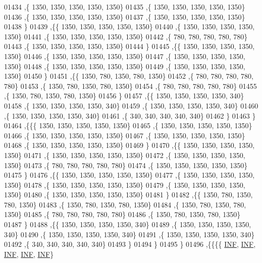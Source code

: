 \begin{DoxyCode}
01434    ,\{  1350,  1350,  1350,  1350,  1350\}
01435    ,\{  1350,  1350,  1350,  1350,  1350\}
01436    ,\{  1350,  1350,  1350,  1350,  1350\}
01437    ,\{  1350,  1350,  1350,  1350,  1350\}
01438    \}
01439   ,\{\{  1350,  1350,  1350,  1350,  1350\}
01440    ,\{  1350,  1350,  1350,  1350,  1350\}
01441    ,\{  1350,  1350,  1350,  1350,  1350\}
01442    ,\{   780,   780,   780,   780,   780\}
01443    ,\{  1350,  1350,  1350,  1350,  1350\}
01444    \}
01445   ,\{\{  1350,  1350,  1350,  1350,  1350\}
01446    ,\{  1350,  1350,  1350,  1350,  1350\}
01447    ,\{  1350,  1350,  1350,  1350,  1350\}
01448    ,\{  1350,  1350,  1350,  1350,  1350\}
01449    ,\{  1350,  1350,  1350,  1350,  1350\}
01450    \}
01451   ,\{\{  1350,   780,  1350,   780,  1350\}
01452    ,\{   780,   780,   780,   780,   780\}
01453    ,\{  1350,   780,  1350,   780,  1350\}
01454    ,\{   780,   780,   780,   780,   780\}
01455    ,\{  1350,   780,  1350,   780,  1350\}
01456    \}
01457   ,\{\{  1350,  1350,  1350,  1350,   340\}
01458    ,\{  1350,  1350,  1350,  1350,   340\}
01459    ,\{  1350,  1350,  1350,  1350,   340\}
01460    ,\{  1350,  1350,  1350,  1350,   340\}
01461    ,\{   340,   340,   340,   340,   340\}
01462    \}
01463   \}
01464  ,\{\{\{  1350,  1350,  1350,  1350,  1350\}
01465    ,\{  1350,  1350,  1350,  1350,  1350\}
01466    ,\{  1350,  1350,  1350,  1350,  1350\}
01467    ,\{  1350,  1350,  1350,  1350,  1350\}
01468    ,\{  1350,  1350,  1350,  1350,  1350\}
01469    \}
01470   ,\{\{  1350,  1350,  1350,  1350,  1350\}
01471    ,\{  1350,  1350,  1350,  1350,  1350\}
01472    ,\{  1350,  1350,  1350,  1350,  1350\}
01473    ,\{   780,   780,   780,   780,   780\}
01474    ,\{  1350,  1350,  1350,  1350,  1350\}
01475    \}
01476   ,\{\{  1350,  1350,  1350,  1350,  1350\}
01477    ,\{  1350,  1350,  1350,  1350,  1350\}
01478    ,\{  1350,  1350,  1350,  1350,  1350\}
01479    ,\{  1350,  1350,  1350,  1350,  1350\}
01480    ,\{  1350,  1350,  1350,  1350,  1350\}
01481    \}
01482   ,\{\{  1350,   780,  1350,   780,  1350\}
01483    ,\{  1350,   780,  1350,   780,  1350\}
01484    ,\{  1350,   780,  1350,   780,  1350\}
01485    ,\{   780,   780,   780,   780,   780\}
01486    ,\{  1350,   780,  1350,   780,  1350\}
01487    \}
01488   ,\{\{  1350,  1350,  1350,  1350,   340\}
01489    ,\{  1350,  1350,  1350,  1350,   340\}
01490    ,\{  1350,  1350,  1350,  1350,   340\}
01491    ,\{  1350,  1350,  1350,  1350,   340\}
01492    ,\{   340,   340,   340,   340,   340\}
01493    \}
01494   \}
01495  \}
01496 ,\{\{\{\{   \mbox{\hyperlink{1_88_84__epars_8h_a12c2040f25d8e3a7b9e1c2024c618cb6}{INF}},   \mbox{\hyperlink{1_88_84__epars_8h_a12c2040f25d8e3a7b9e1c2024c618cb6}{INF}},   \mbox{\hyperlink{1_88_84__epars_8h_a12c2040f25d8e3a7b9e1c2024c618cb6}{INF}},   \mbox{\hyperlink{1_88_84__epars_8h_a12c2040f25d8e3a7b9e1c2024c618cb6}{INF}},   \mbox{\hyperlink{1_88_84__epars_8h_a12c2040f25d8e3a7b9e1c2024c618cb6}{INF}}\}

\end{DoxyCode}
